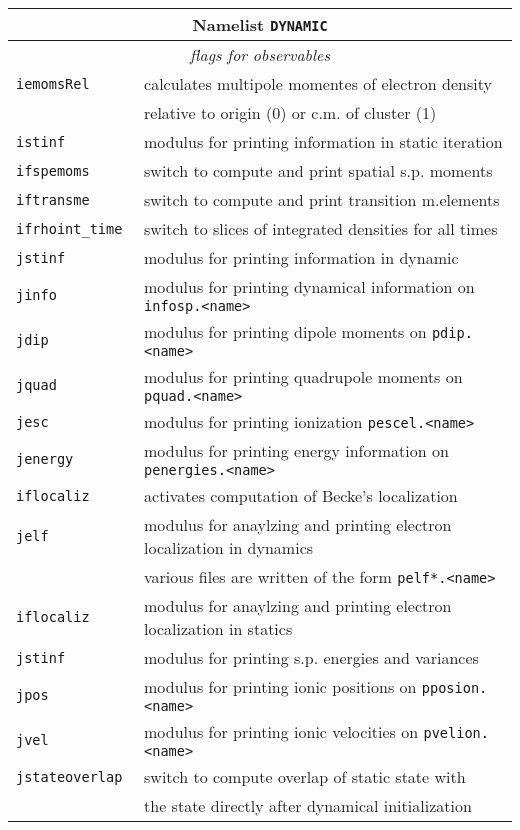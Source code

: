 \documentclass[12pt]{article}
\begin{document}
\begin{enumerate}
\begin{tabular}{ll}
\hline
\multicolumn{2}{c}{Namelist {\tt DYNAMIC}} in {\tt for005.<name>} \\
\hline
\multicolumn{2}{c}{\it flags for observables} \\
\hline
{\tt iemomsRel        }& calculates multipole momentes of electron density \\
{\tt                  }& relative to origin (0) or c.m. of cluster (1)\\
{\tt istinf           }& modulus for printing information in static iteration \\
{\tt ifspemoms        }& switch to compute and print spatial s.p. moments\\
{\tt iftransme        }& switch to compute and print transition m.elements\\
{\tt ifrhoint\_time   }& switch to slices of integrated densities for all times\\
{\tt jstinf           }& modulus for printing information in dynamic \\
{\tt jinfo            }& modulus for printing dynamical information on {\tt
  infosp.<name>} \\
{\tt jdip             }& modulus for printing dipole moments on {\tt pdip.<name>}\\
{\tt jquad            }& modulus for printing quadrupole moments on {\tt pquad.<name>}\\
{\tt jesc            }& modulus for printing ionization {\tt pescel.<name>}\\
{\tt jenergy          }& modulus for printing energy information on {\tt penergies.<name>} \\
{\tt iflocaliz}        & activates computation of Becke's localization
\\
{\tt jelf}             & modulus for anaylzing and printing electron
localization in dynamics
\\
 & various files are written of the form {\tt pelf*.<name>}
\\
{\tt iflocaliz}             & modulus for anaylzing and printing electron
localization in statics
\\
{\tt jstinf}           & modulus for printing s.p. energies and variances
\\
{\tt jpos}           & modulus for printing ionic positions on {\tt pposion.<name>}
\\
{\tt jvel}           & modulus for printing ionic velocities on {\tt pvelion.<name>}
\\
{\tt jstateoverlap}  & switch to compute overlap of static state
                       with\\
                     & the state directly after dynamical
                       initialization
\\
\hline
\end{tabular}




\end{enumerate}
\end{document}
